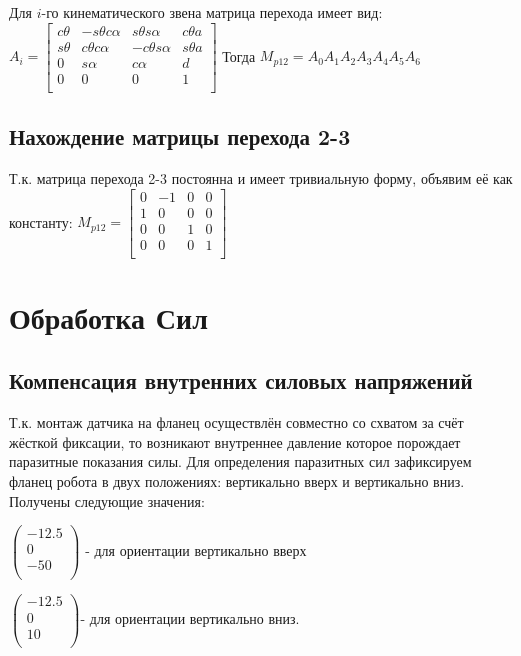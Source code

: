 \documentclass[a4paper,14pt,russian]{extreport} \usepackage{extsizes}
\begin{document}
	Для $i$-го кинематического звена матрица перехода имеет вид: 
	\newline
	\centering
 	$A_{i} =\begin{bmatrix}
 	c \theta & -s \theta c \alpha & s \theta s\alpha&   c \theta a\\
 	s\theta & c\theta c\alpha & -c\theta s\alpha & s \theta a\\
 	0       &    s\alpha   &         c\alpha &             d\\
 	0       &    0          &           0    &                  1\\
	 \end{bmatrix}$ 
	\flushleft
	Тогда ${M_{p12}}=A_{0}A_{1}A_{2}A_{3}A_{4}A_{5}A_{6}$
	\subsection{Нахождение матрицы перехода 2-3}
	Т.к. матрица перехода 2-3 постоянна и имеет тривиальную форму, объявим её как константу:
	${M_{p12}}=\begin{bmatrix}
		 0 &-1&0&0\\ 1&0&0&0\\0 &0&1&0\\0&0&0&1\\
	\end{bmatrix}$
	\section{Обработка Сил}
	\subsection{Компенсация внутренних силовых напряжений}
	Т.к. монтаж датчика на фланец осуществлён совместно со схватом за счёт жёсткой фиксации, то возникают внутреннее давление которое порождает паразитные показания силы. 
	Для определения паразитных сил зафиксируем фланец робота в двух положениях: вертикально вверх и вертикально вниз. Получены следующие значения: 
	
	$\begin{pmatrix}
		-12.5 \\ 0 \\ -50\\
	\end{pmatrix}$ - для ориентации вертикально вверх
	
	$\begin{pmatrix}
	-12.5 \\ 0 \\ 10\\
	\end{pmatrix} $- для ориентации  вертикально вниз.
	
\end{document}
